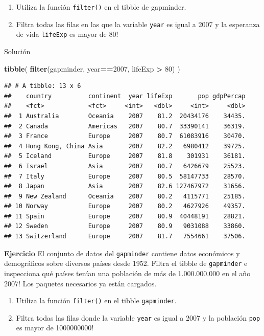 \documentclass[
]{book}
\newenvironment{Shaded}{\begin{snugshade}}{\end{snugshade}}
\newcommand{\DecValTok}[1]{\textcolor[rgb]{0.00,0.00,0.81}{#1}}
\newcommand{\KeywordTok}[1]{\textcolor[rgb]{0.13,0.29,0.53}{\textbf{#1}}}
\newcommand{\NormalTok}[1]{#1}
\newcommand{\OperatorTok}[1]{\textcolor[rgb]{0.81,0.36,0.00}{\textbf{#1}}}
\newcommand{\StringTok}[1]{\textcolor[rgb]{0.31,0.60,0.02}{#1}}
\providecommand{\tightlist}{%
  \setlength{\itemsep}{0pt}\setlength{\parskip}{0pt}}
\begin{document}
\begin{enumerate}
\def\labelenumi{\arabic{enumi}.}
\tightlist
\item
  Utiliza la función \texttt{filter()} en el tibble de gapminder.
\item
  Filtra todas las filas en las que la variable \texttt{year} es igual a 2007 y la esperanza de vida \texttt{lifeExp} es mayor de 80!
\end{enumerate}

Solución

\begin{Shaded}
\begin{Highlighting}[]
\KeywordTok{tibble}\NormalTok{(}
\KeywordTok{filter}\NormalTok{(gapminder, year}\OperatorTok{==}\DecValTok{2007}\NormalTok{, lifeExp }\OperatorTok{>}\StringTok{ }\DecValTok{80}\NormalTok{)}
\NormalTok{)}
\end{Highlighting}
\end{Shaded}

\begin{verbatim}
## # A tibble: 13 x 6
##    country          continent  year lifeExp       pop gdpPercap
##    <fct>            <fct>     <int>   <dbl>     <int>     <dbl>
##  1 Australia        Oceania    2007    81.2  20434176    34435.
##  2 Canada           Americas   2007    80.7  33390141    36319.
##  3 France           Europe     2007    80.7  61083916    30470.
##  4 Hong Kong, China Asia       2007    82.2   6980412    39725.
##  5 Iceland          Europe     2007    81.8    301931    36181.
##  6 Israel           Asia       2007    80.7   6426679    25523.
##  7 Italy            Europe     2007    80.5  58147733    28570.
##  8 Japan            Asia       2007    82.6 127467972    31656.
##  9 New Zealand      Oceania    2007    80.2   4115771    25185.
## 10 Norway           Europe     2007    80.2   4627926    49357.
## 11 Spain            Europe     2007    80.9  40448191    28821.
## 12 Sweden           Europe     2007    80.9   9031088    33860.
## 13 Switzerland      Europe     2007    81.7   7554661    37506.
\end{verbatim}

\textbf{Ejercicio}
El conjunto de datos del \texttt{gapminder} contiene datos económicos y demográficos sobre diversos países desde 1952. Filtra el tibble de \texttt{gapminder} e inspecciona qué países tenían una población de más de 1.000.000.000 en el año 2007! Los paquetes necesarios ya están cargados.

\begin{enumerate}
\def\labelenumi{\arabic{enumi}.}
\tightlist
\item
  Utiliza la función \texttt{filter()} en el tibble \texttt{gapminder}.
\item
  Filtra todas las filas donde la variable \texttt{year} es igual a 2007 y la población \texttt{pop} es mayor de 1000000000!
\end{enumerate}
\end{document}
